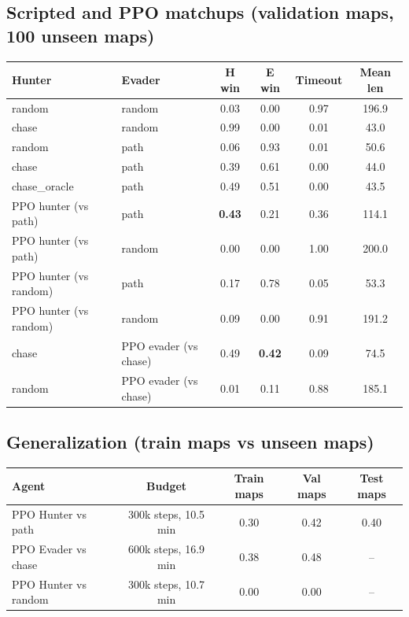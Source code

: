 \documentclass[11pt,a4paper]{article}
\begin{document}
\subsection{Scripted and PPO matchups (validation maps, 100 unseen maps)}
\begin{center}
\begin{tabular}{llcccc}
\toprule
\textbf{Hunter} & \textbf{Evader} & \textbf{H win} & \textbf{E win} & \textbf{Timeout} & \textbf{Mean len}\\
\midrule
random & random & 0.03 & 0.00 & 0.97 & 196.9\\
chase & random & 0.99 & 0.00 & 0.01 & 43.0\\
random & path & 0.06 & 0.93 & 0.01 & 50.6\\
chase & path & 0.39 & 0.61 & 0.00 & 44.0\\
chase\_oracle & path & 0.49 & 0.51 & 0.00 & 43.5\\
\midrule
PPO hunter (vs path) & path & \textbf{0.43} & 0.21 & 0.36 & 114.1\\
PPO hunter (vs path) & random & 0.00 & 0.00 & 1.00 & 200.0\\
PPO hunter (vs random) & path & 0.17 & 0.78 & 0.05 & 53.3\\
PPO hunter (vs random) & random & 0.09 & 0.00 & 0.91 & 191.2\\
chase & PPO evader (vs chase) & 0.49 & \textbf{0.42} & 0.09 & 74.5\\
random & PPO evader (vs chase) & 0.01 & 0.11 & 0.88 & 185.1\\
\bottomrule
\end{tabular}
\end{center}

\subsection{Generalization (train maps vs unseen maps)}
\begin{center}
\begin{tabular}{lcccc}
\toprule
\textbf{Agent} & \textbf{Budget} & \textbf{Train maps} & \textbf{Val maps} & \textbf{Test maps}\\
\midrule
PPO Hunter vs path & 300k steps, 10.5 min & 0.30 & 0.42 & 0.40\\
PPO Evader vs chase & 600k steps, 16.9 min & 0.38 & 0.48 & --\\
PPO Hunter vs random & 300k steps, 10.7 min & 0.00 & 0.00 & --\\
\bottomrule
\end{tabular}
\end{center}
\end{document}
